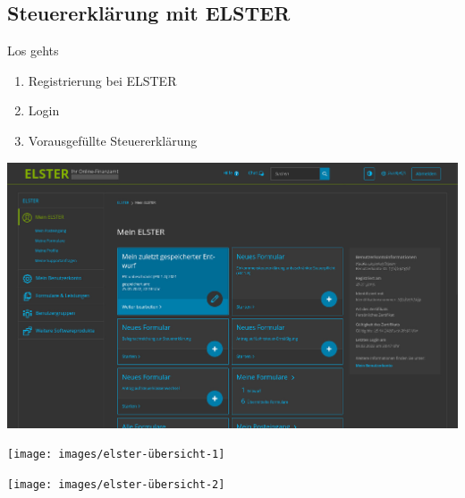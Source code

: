 \documentclass[draft]{beamer}
\begin{document}
		\subsection{Steuererklärung mit ELSTER}
		
			\begin{frame}{Los gehts}
				\begin{enumerate}
					\item Registrierung bei ELSTER
					\item Login
					\item Vorausgefüllte Steuererklärung
				\end{enumerate}
			\end{frame}
		
			\begin{frame}
				\begin{center}
					\vspace{-0.6cm}
					\hspace*{-0.91cm}
					\includegraphics[scale=0.24]{images/elster-1}
				\end{center}
			\end{frame}
		
			\begin{frame}
				\begin{center}
					\vspace{-0.6cm}
					\hspace*{-0.91cm}
					\texttt{[image: images/elster-übersicht-1]}
				\end{center}
			\end{frame}
		
			\begin{frame}
				\begin{center}
					\vspace{-0.6cm}
					\hspace*{-0.91cm}
					\texttt{[image: images/elster-übersicht-2]}
				\end{center}
			\end{frame}
		
\end{document}
